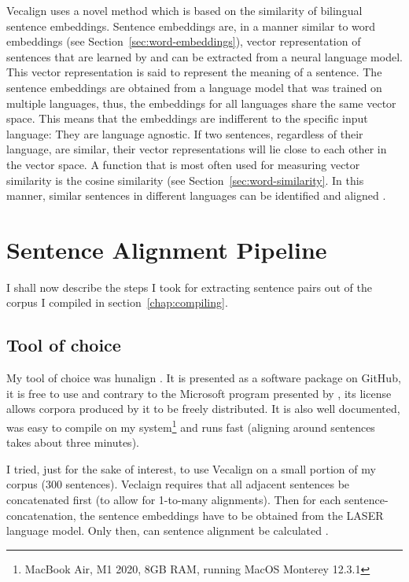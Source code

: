 Vecalign uses a novel method which is based on the similarity of bilingual sentence embeddings. 
Sentence embeddings are, in a manner similar to word embeddings (see Section~\ref{sec:word-embeddings}), vector representation of sentences that are learned by and can be extracted from a neural language model. 
This vector representation is said to represent the meaning of a sentence. 
The sentence embeddings are obtained from a language model that was trained on multiple languages, thus, the embeddings for all languages share the same vector space.
This means that the embeddings are indifferent to the specific input language: They are language agnostic.
If two sentences, regardless of their language, are similar, their vector representations will lie close to each other in the vector space. 
A function that is most often used for measuring vector similarity is the cosine similarity (see Section~\ref{sec:word-similarity}.
In this manner, similar sentences in different languages can be identified and aligned \autocite{artexte-schwenk-2019-laser}.


\section{Sentence Alignment Pipeline}

I shall now describe the steps I took for extracting sentence pairs out of  the corpus I compiled in section~\ref{chap:compiling}.

\subsection{Tool of choice}
\label{subsec:tool}
My tool of choice was hunalign \autocite{hunalign}. 
It is presented as a software package on GitHub, it is free to use and contrary to the Microsoft program presented by \cite{moore2002fast}, its license allows corpora produced by it to be freely distributed. 
It is also well documented, was easy to compile on my system\footnote{MacBook Air, M1 2020, 8GB RAM, running MacOS Monterey 12.3.1} and runs fast (aligning around  sentences takes about three minutes). 

I tried, just for the sake of interest, to use Vecalign on a small portion of my corpus (300 sentences). 
Veclaign requires that all adjacent sentences be concatenated first (to allow for 1-to-many alignments). 
Then for each sentence-concatenation, the sentence embeddings have to be obtained from the LASER language model. 
Only then, can sentence alignment be calculated \autocite{thompson-koehn-2019-vecalign}. 

